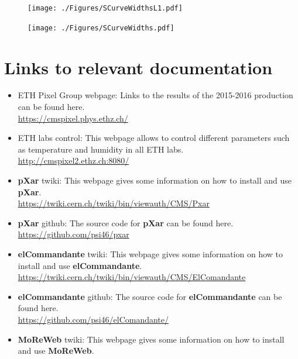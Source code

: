 \documentclass[a4paper,12pt,twoside]{article}
\begin{document}
\begin{appendices}
\begin{figure} [h!]
\centering
\begin{minipage}{.48\textwidth}
  \centering
  \texttt{[image: ./Figures/SCurveWidthsL1.pdf]}
  \label{SCurveL1}
\end{minipage}%
\hspace{2mm}
\begin{minipage}{.48\textwidth}
  \centering
  \texttt{[image: ./Figures/SCurveWidths.pdf]}
  \label{SCurveL2}
\end{minipage}
\end{figure}

\section{Links to relevant documentation}  \label{Links}
\begin{itemize}
\item ETH Pixel Group webpage: Links to the results of the 2015-2016 production can be found here. \\
\url{https://cmspixel.phys.ethz.ch/}
\item ETH labs control: This webpage allows to control different parameters such as temperature and humidity in all ETH labs. \\
\url{http://cmspixel2.ethz.ch:8080/}
\item \textbf{pXar} twiki: This webpage gives some information on how to install and use \textbf{pXar}. \\
\url{https://twiki.cern.ch/twiki/bin/viewauth/CMS/Pxar}
\item \textbf{pXar} github: The source code for \textbf{pXar} can be found here. \\
\url{https://github.com/psi46/pxar}
\item \textbf{elCommandante} twiki: This webpage gives some information on how to install and use \textbf{elCommandante}. \\
\url{https://twiki.cern.ch/twiki/bin/viewauth/CMS/ElComandante}
\item \textbf{elCommandante} github: The source code for \textbf{elCommandante} can be found here.\\
\url{https://github.com/psi46/elComandante/}
\item \textbf{MoReWeb} twiki: This webpage gives some information on how to install and use \textbf{MoReWeb}. \\

\end{itemize}
\end{appendices}
\end{document}

